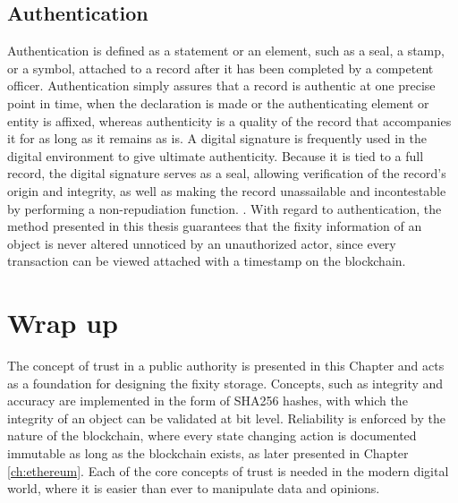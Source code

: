\subsection{Authentication}
Authentication is defined as a statement or an element, such as a seal, a stamp, or a symbol, attached to a record after it has been completed by a competent officer. Authentication simply assures that a record is authentic at one precise point in time, when the declaration is made or the authenticating element or entity is affixed, whereas authenticity is a quality of the record that accompanies it for as long as it remains as is. A digital signature is frequently used in the digital environment to give ultimate authenticity. Because it is tied to a full record, the digital signature serves as a seal, allowing verification of the record's origin and integrity, as well as making the record unassailable and incontestable by performing a non-repudiation function. \cite[53]{duranti2009digital}.
With regard to authentication, the method presented in this thesis guarantees that the fixity information of an object is never altered unnoticed by an unauthorized actor, since every transaction can be viewed attached with a timestamp on the blockchain.

\section{Wrap up}
The concept of trust in a public authority is presented in this Chapter and acts as a foundation for designing the fixity storage. Concepts, such as integrity and accuracy are implemented in the form of SHA256 hashes, with which the integrity of an object can be validated at bit level. Reliability is enforced by the nature of the blockchain, where every state changing action is documented immutable as long as the blockchain exists, as later presented in Chapter \ref{ch:ethereum}. Each of the core concepts of trust is needed in the modern digital world, where it is easier than ever to manipulate data and opinions.